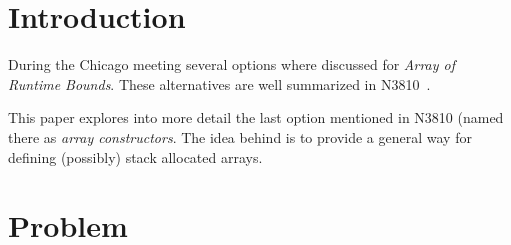 \section{Introduction}

During the Chicago meeting several options where discussed for \emph{Array of
Runtime Bounds}. These alternatives are well summarized in N3810~\cite{n3810}.

This paper explores into more detail the last option mentioned in N3810 (named
there as \emph{array constructors}. The idea behind is to provide a general way
for defining (possibly) stack allocated arrays.

\section{Problem}




